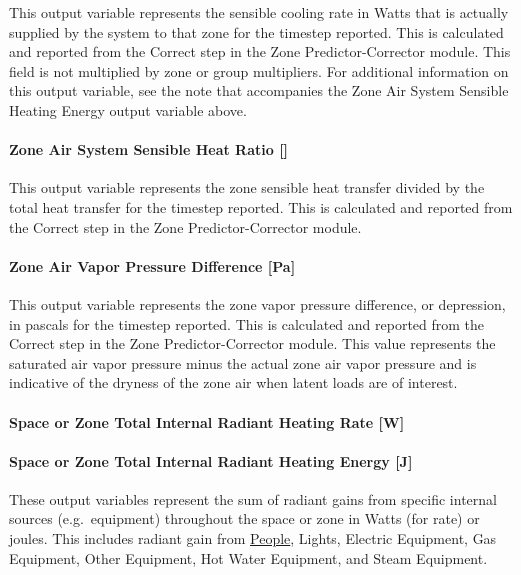 This output variable represents the sensible cooling rate in Watts that is actually supplied by the system to that zone for the timestep reported. This is calculated and reported from the Correct step in the Zone Predictor-Corrector module. This field is not multiplied by zone or group multipliers. For additional information on this output variable, see the note that accompanies the Zone Air System Sensible Heating Energy output variable above.

\paragraph{Zone Air System Sensible Heat Ratio {[}{]}}\label{zone-air-system-sensible-heat-ratio}

This output variable represents the zone sensible heat transfer divided by the total heat transfer for the timestep reported. This is calculated and reported from the Correct step in the Zone Predictor-Corrector module.

\paragraph{Zone Air Vapor Pressure Difference {[}Pa{]}}\label{zone-air-vapor-pressure-difference-pa}

This output variable represents the zone vapor pressure difference, or depression, in pascals for the timestep reported. This is calculated and reported from the Correct step in the Zone Predictor-Corrector module. This value represents the saturated air vapor pressure minus the actual zone air vapor pressure and is indicative of the dryness of the zone air when latent loads are of interest.

\paragraph{Space or Zone Total Internal Radiant Heating Rate {[}W{]}}\label{zone-total-internal-radiant-heating-rate-w}

\paragraph{Space or Zone Total Internal Radiant Heating Energy {[}J{]}}\label{zone-total-internal-radiant-heating-energy-j}

These output variables represent the sum of radiant gains from specific internal sources (e.g.~equipment) throughout the space or zone in Watts (for rate) or joules. This includes radiant gain from \hyperref[people]{People}, Lights, Electric Equipment, Gas Equipment, Other Equipment, Hot Water Equipment, and Steam Equipment.

